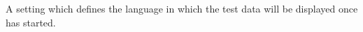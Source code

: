 \item[Default Language for Test Data]{
A setting which defines the language in which the test data will be 
displayed once \GD has started. 
}

